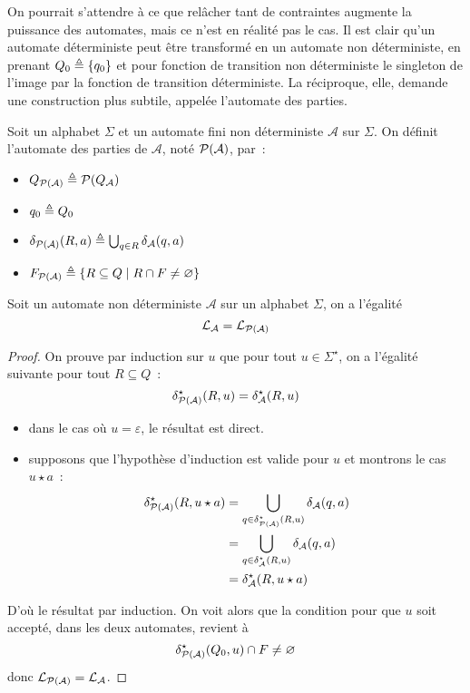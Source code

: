 On pourrait s'attendre à ce que relâcher tant de contraintes augmente la
puissance des automates, mais ce n'est en réalité pas le cas. Il est clair qu'un
automate déterministe peut être transformé en un automate non déterministe, en
prenant $Q_0 \triangleq \{q_0\}$ et pour fonction de transition non déterministe le
singleton de l'image par la fonction de transition déterministe. La réciproque,
elle, demande une construction plus subtile, appelée l'automate des parties.

\begin{definition}
  Soit un alphabet $\Sigma$ et un automate fini non déterministe $\mathcal A$
  sur $\Sigma$. On définit l'automate des parties de $\mathcal A$, noté
  $\mathcal{P}(\mathcal A)$, par~:
  \begin{itemize}
  \item $Q_{\mathcal{P}(\mathcal A)} \triangleq \mathcal{P}(Q_\mathcal A)$
  \item $q_0 \triangleq Q_0$
  \item $\delta_{\mathcal{P}(\mathcal A)} (R,a) \triangleq
    \bigcup_{q \in R} \delta_{\mathcal A}(q,a)$
  \item $F_{\mathcal{P}(\mathcal A)} \triangleq \{R \subseteq Q\mid
    R\cap F \neq \varnothing\}$
  \end{itemize}
\end{definition}

\begin{proposition}
  Soit un automate non déterministe $\mathcal A$ sur un alphabet $\Sigma$, on a
  l'égalité
  \[\mathcal L_{\mathcal A} = \mathcal L_{\mathcal{P}(\mathcal A)}\]
\end{proposition}

\begin{proof}
  On prouve par induction sur $u$ que pour tout $u \in \Sigma^\star$, on a
  l'égalité suivante pour tout $R \subseteq Q$~:
  \[\delta^\star_{\mathcal{P}(\mathcal A)}(R,u) = \delta^\star_{\mathcal A}(R,u)\]
  \begin{itemize}
  \item dans le cas où $u = \varepsilon$, le résultat est direct.
  \item supposons que l'hypothèse d'induction est valide pour $u$ et montrons
    le cas $u \star a$~:
    \begin{align*}
      \delta^\star_{\mathcal{P}(\mathcal A)}(R,u\star a) &=
      \bigcup_{q \in \delta^\star_{\mathcal{P}(\mathcal A)}(R,u)}
      \delta_{\mathcal A}(q,a)\\
      &= \bigcup_{q \in \delta^\star_\mathcal A(R,u)} \delta_\mathcal A(q,a)\\
      &= \delta_\mathcal A^\star(R,u\star a)
    \end{align*}
  \end{itemize}
  D'où le résultat par induction. On voit alors que la condition pour que
  $u$ soit accepté, dans les deux automates, revient à
  \[\delta_{\mathcal{P}(\mathcal A)}^\star (Q_0,u) \cap F \neq \varnothing\]
  donc $\mathcal L_{\mathcal{P}(\mathcal A)} = \mathcal L_\mathcal A$.
\end{proof}


